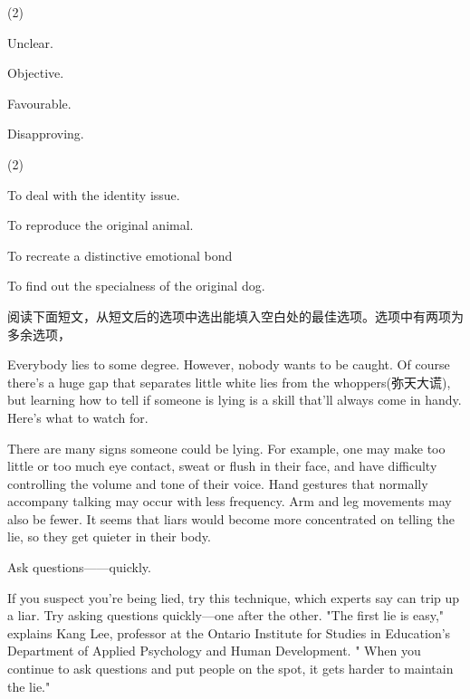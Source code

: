 \documentclass{英语试卷}
\begin{document}
\begin{choices}(2)
  \item Unclear.
  \item Objective.
  \item Favourable.
  \item Disapproving.
\end{choices}
\begin{choices}(2)
  \item To deal with the identity issue.
  \item To reproduce the original animal.
  \item To recreate a distinctive emotional bond
  \item To find out the specialness of the original dog.
\end{choices}
\par 阅读下面短文，从短文后的选项中选出能填入空白处的最佳选项。选项中有两项为多余选项，\par
\par Everybody lies to some degree.  However, nobody wants to be caught. Of course there's a huge gap that separates little white lies from the whoppers(弥天大谎), but learning how to tell if someone is lying is a skill that'll always come in handy. Here's what to watch for.\par
\par {}\par
\par There are many signs someone could be lying. For example, one may make too little or too much eye contact, sweat or flush in their face, and have difficulty controlling the volume and tone of their voice.  Hand gestures that normally accompany talking may occur with less frequency. Arm and leg movements may also be fewer. It seems that liars would become more concentrated on telling the lie, so they get quieter in their body.\par
\par Ask questions——quickly.\par
\par If you suspect you're being lied, try this technique, which experts say can trip up a liar. Try asking questions quickly—one after the other. "The first lie is easy," explains Kang Lee, professor at the Ontario Institute for Studies in Education's Department of Applied Psychology and Human Development. " When you continue to ask questions and put people on the spot, it gets harder to maintain the lie."\par
\end{document}
